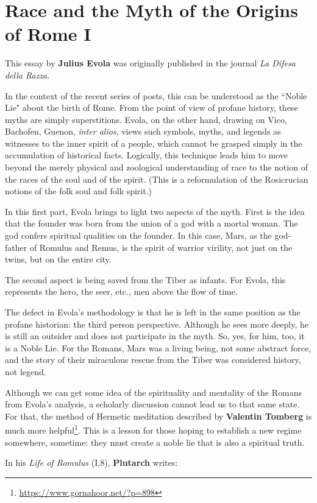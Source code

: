 \section{Race and the Myth of the Origins of Rome I}

\begin{quotationx}
This essay by \textbf{Julius Evola} was originally published in the journal \emph{La Difesa della Razza}.

In the context of the recent series of posts, this can be understood as the ``Noble Lie" about the birth of Rome. From the point of view of profane history, these myths are simply superstitions. Evola, on the other hand, drawing on Vico, Bachofen, Guenon, \emph{inter alios}, views such symbols, myths, and legends as witnesses to the inner spirit of a people, which cannot be grasped simply in the accumulation of historical facts. Logically, this technique leads him to move beyond the merely physical and zoological understanding of race to the notion of the races of the soul and of the spirit. (This is a reformulation of the Rosicrucian notions of the folk soul and folk spirit.)

In this first part, Evola brings to light two aspects of the myth. First is the idea that the founder was born from the union of a god with a mortal woman. The god confers spiritual qualities on the founder. In this case, Mars, as the god-father of Romulus and Remus, is the spirit of warrior virility, not just on the twins, but on the entire city.

The second aspect is being saved from the Tiber as infants. For Evola, this represents the hero, the seer, etc., men above the flow of time.

The defect in Evola's methodology is that he is left in the same position as the profane historian: the third person perspective. Although he sees more deeply, he is still an outsider and does not participate in the myth. So, yes, for him, too, it is a Noble Lie. For the Romans, Mars was a living being, not some abstract force, and the story of their miraculous rescue from the Tiber was considered history, not legend.

Although we can get some idea of the spirituality and mentality of the Romans from Evola's analysis, a scholarly discussion cannot lead us to that same state. For that, the method of Hermetic meditation described by \textbf{Valentin Tomberg} is much more helpful\footnote{\url{https://www.gornahoor.net/?p=898}}. This is a lesson for those hoping to establish a new regime somewhere, sometime: they must create a noble lie that is also a spiritual truth. 

\end{quotationx}
In his \emph{Life of Romulus} (I,8), \textbf{Plutarch} writes:

